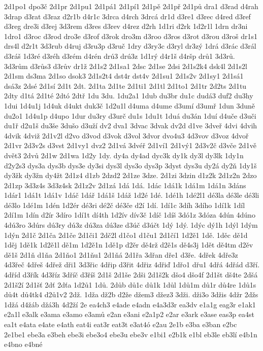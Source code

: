 2d1po1
dpo3č
2d1pr
2d1pu1
2d1pá1
2d1pí1
2d1pě
2d1př
2d1pů
dra1
d3rad
d4rah
3drap
d3rat
d3raz
d2r1b
d4r1c
3drca
d4rch
3drcá
dr1d
d3re1
d3rec
d4red
d3ref
d3reg
dre3i
d3rej
3d3rem
d3res
d3rev
d4rez
d2rh
1d1ri
d2rk
1d2r1l
1drn
dr3ni
1dro1
d3roc
d3rod
dro3e
d3rof
d3rok
dro3m
d3roo
d3ros
d3rot
d3rou
d3roš
dr1s1
drs4l
d2r1t
3d3rub
d4ruj
d3ru3p
d3ruč
1dry
d3ry3c
d3ryl
dr3zý
1drá
d3rác
d3rál
d3ráš
1d3ré
d3réh
d3rém
d4rén
drú3
drú3z
1d1rý
d4r1š
d4ršp
drů1
3d3rů.
3d3rům
d3růs3
d3rův
dr1ž
2d1s2
2d1sa1
2dsc
2d1se
2dsi
2d1s2k4
dsk4l
2d1s2l
2d1sm
ds3ma
2d1so
dsok3
2d1s2t4
dst4r
dst4v
2d1su1
2d1s2v
2d1sy1
2d1sá1
dsá3z
2dsé
2d1sí
2d1t
2dt.
2d1ta
2d1te
2d1ti1
2d1tl
2d1to1
2d1tr
2d2ts
2d1tu
2dty
d1tá
2d1té
2dtó
2dtř
1du
3du.
1du2a1
1dub
du3br
du1c
dudá3
duf2
du3hy
1dui
1d4u1j
1d4uk
d4ukt
duk3č
1d2u1l
d4uma
d4ume
d3umí
d3umř
1dun
3duně
du2o1
1d4u1p
d4upo
1dur
du3ry
d3urč
du1s
1du1t
1duá
du3án
1duí
d4uče
d3uči
du1ř
d2u1š
du3še
3dušo
d3uží
dv2
dva1
3dvac
3dvak
dv2d
d1ve
3dveř
4dvi
4dvih
4dvik
4dviž
2d1v2l
d2vo
d3vod
d3vok
d3vol
3dvor
dvo4u3
4d3vov
d3voz
4dvoř
2d1vr
2d3v2s
d3vst
2d1vy1
dvz2
2d1vá
3dvéř
2d1ví1
2d1vý1
2d3v2č
d3vče
2d1vě
dvět3
2dvů
2d1w
2d1wa
1d2y
1dy.
dy4a
dy4ad
dyc3k
dy1k
dy3l
dy3lk
1dy1n
d2y2s3
dys3a
dys3b
dys3e
dy3si
dys3l
dys3o
dys3p
3dyst
dys3u
dy2á
dy2ň
1dy1š
dy3žk
dy3žn
dy4žt
2d1z4
d1zb
2dzd2
2d1ze
3dze.
2d1zi
3dzin
d1z2k
2d1z2n
2dzo
2d1zp
3d3z4s
3d3z4sk
2d1z2v
2d1zá
1dá
1dá.
1dác
1dá1k
1dá1m
1dá1n
3dáns
1dár1
1dá1t
1dá1v
1dáč
1dář
1dá1š
1dáž
1d2é
1dé.
1dé1h
1dé2l1
dé3la
dé3le
dé3li
dé3lo
1dé1m
1dén
1d2ér
dé3ri
dé2č
dé3če
d2í
1dí.
1dí1c
3díh
3dího
1dí1k
1díl
2dí1m
1dín
d2ír
3díro
1dí1t
dí4th
1d2ív
dív3č
1díč
1díš
3dó1z
3dóza
4dún
4dúno
4dú3ro
3dúrs
dú3ry
dú3z
dú3za
dú3ze
d3úč
d3účt
1dý
1dý.
1dýc
dý1h
1dýl
1dým
1dýn
2d1č
2d1ča
2d1če
2d1či1
2dč2l
d1čo1
d1ču1
2d1čí1
1d2ě1
1dě.
1děc
dě1d
1děj
1dě1k
1d2ě1l
dě1m
1d2ě1n
1dě1p
d2ěr
dě4rž
d2ě1s
dě4s3j
1dět
dě4tm
d2ěv
dě1š
2d1ň
d1ňa
2d1ňo1
2d1ňu1
2d1ňá
2d1řa
3dřan
dře1
d3ře.
4dřek
4dře3z
4d3řeč
4dřeš
4dřež
dři1
3d3řic
4dřip
d3řit
4dřiz
4dřiď
1dřo1
dřu1
4dřá
4dřád
d3ří.
4dříd
d3řík
4d3říz
3dříč
d3říš
2d1š
2d1še
2dši
2d1š2k
dšo4
dšo4f
2d1št
dš4te
2dšá
2d1š2í
2d1šť
2dť
2dťa
1d2ů1
1dů.
2důb
dů1c
dů1k
1důl
1dů1m
dů1r
dů4re
1dů1s
dů4t
dů4tk4
d2ů1v2
2dž.
1dža
dž2b
d2že
džem3
džez3
3dži.
dži3o
3džis
4džr
2džs
1džá
d4žáb
džá3h
4d2ží
2e
ea4ch3
e4ade
e4adn
e4a3d3r
ea3dv
e1a1g
eag3r
e1ak1
e2a1l
e3alk
e3ama
e3amo
e3amů
e2an
e3ani
e2a1p2
e2ar
e3ark
e3ase
eas3p
ea4st
ea1t
e4ata
e4ate
e4ath
eat4i
eat3r
eat3t
e3at4ó
e2au
2e1b
e3ba
e3ban
e2bc
2e1be1
ebe3a
e3beh
ebe3i
ebe3o4
ebe3u
ebe3v
e1bi1
e2b1k
e1bl
eb3le
eb3lí
e4b1n
e4bno
e4bné

